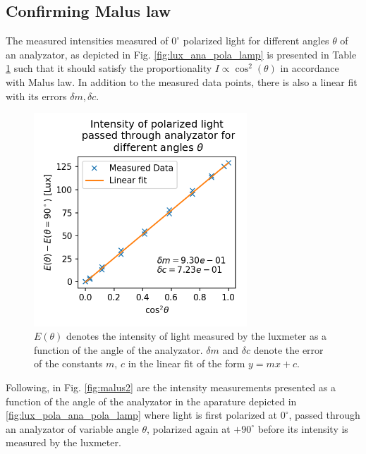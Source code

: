 \documentclass[11pt,a4paper, twocolumn]{article}
\begin{document}
  \subsection{Confirming Malus law}

  The measured intensities measured of $0^\circ$ polarized light for different angles $\theta$ of an analyzator, as depicted in Fig. \ref{fig:lux_ana_pola_lamp} is presented in Table \ref{fig:malus1} such that it should satisfy the proportionality $I \propto \cos^2(\theta)$ in accordance with Malus law. In addition to the measured data points, there is also a linear fit with its errors $\delta m, \delta c$.


  \begin{figure}[H]
    \center
    \includegraphics[width=8cm]{scripts/malus1.png}
    \caption{$E(\theta)$ denotes the intensity of light measured by the luxmeter as a function of the angle of the analyzator. $\delta m$ and $\delta c$ denote the error of the constants $m$, $c$ in the linear fit of the form $y=mx+c$.}
    \label{fig:malus1}
  \end{figure}

  Following, in Fig. \ref{fig:malus2} are the intensity measurements presented as a function of the angle of the analyzator in the aparature depicted in \ref{fig:lux_pola_ana_pola_lamp} where light is first polarized at $0^\circ$, passed through an analyzator of variable angle $\theta$, polarized again at $+90^\circ$ before its intensity is measured by the luxmeter.
  
\end{document}
